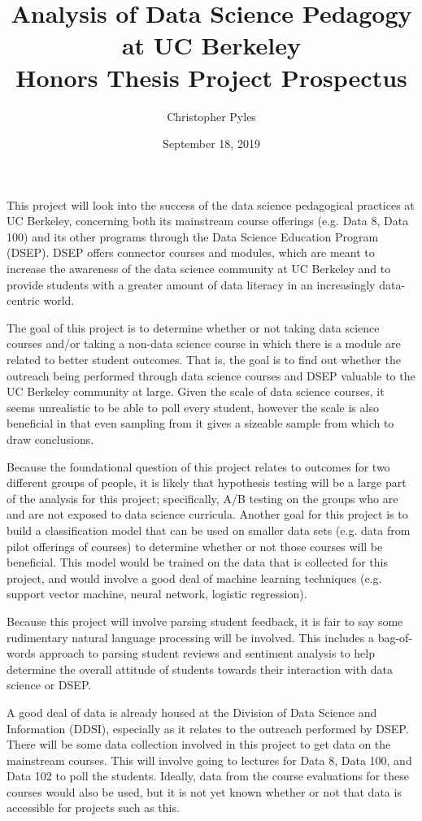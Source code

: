 \documentclass[11pt, oneside]{article}   	%
\title{%
	Analysis of Data Science Pedagogy at UC Berkeley \\ 
	$ $ \\
	\large Honors Thesis Project Prospectus}
\author{Christopher Pyles}
\date{September 18, 2019}							%
\begin{document}
\maketitle

This project will look into the success of the data science pedagogical practices at UC Berkeley, concerning both its mainstream course offerings (e.g. Data 8, Data 100) and its other programs through the Data Science Education Program (DSEP). DSEP offers connector courses and modules, which are meant to increase the awareness of the data science community at UC Berkeley and to provide students with a greater amount of data literacy in an increasingly data-centric world.

\setlength{\parskip}{\baselineskip} %

The goal of this project is to determine whether or not taking data science courses and/or taking a non-data science course in which there is a module are related to better student outcomes. That is, the goal is to find out whether the outreach being performed through data science courses and DSEP valuable to the UC Berkeley community at large. Given the scale of data science courses, it seems unrealistic to be able to poll every student, however the scale is also beneficial in that even sampling from it gives a sizeable sample from which to draw conclusions. 

Because the foundational question of this project relates to outcomes for two different groups of people, it is likely that hypothesis testing will be a large part of the analysis for this project; specifically, A/B testing on the groups who are and are not exposed to data science curricula. Another goal for this project is to build a classification model that can be used on smaller data sets (e.g. data from pilot offerings of courses) to determine whether or not those courses will be beneficial. This model would be trained on the data that is collected for this project, and would involve a good deal of machine learning techniques (e.g. support vector machine, neural network, logistic regression). 

Because this project will involve parsing student feedback, it is fair to say some rudimentary natural language processing will be involved. This includes a bag-of-words approach to parsing student reviews and sentiment analysis to help determine the overall attitude of students towards their interaction with data science or DSEP.

A good deal of data is already housed at the Division of Data Science and Information (DDSI), especially as it relates to the outreach performed by DSEP. There will be some data collection involved in this project to get data on the mainstream courses. This will involve going to lectures for Data 8, Data 100, and Data 102 to poll the students. Ideally, data from the course evaluations for these courses would also be used, but it is not yet known whether or not that data is accessible for projects such as this.
\end{document}
